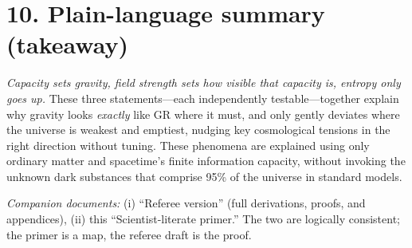 \documentclass[aps,prd,onecolumn,superscriptaddress,nofootinbib]{revtex4-2}
\begin{document}
\section*{10. Plain-language summary (takeaway)}
\emph{Capacity sets gravity, field strength sets how visible that capacity is, entropy only goes up.} These three statements---each independently testable---together explain why gravity looks \emph{exactly} like GR where it must, and only gently deviates where the universe is weakest and emptiest, nudging key cosmological tensions in the right direction without tuning. These phenomena are explained using only ordinary matter and spacetime's finite information capacity, without invoking the unknown dark substances that comprise 95\% of the universe in standard models.

\bigskip
\noindent\textit{Companion documents:} (i) ``Referee version'' (full derivations, proofs, and appendices), (ii) this ``Scientist-literate primer.'' The two are logically consistent; the primer is a map, the referee draft is the proof.
\end{document}
